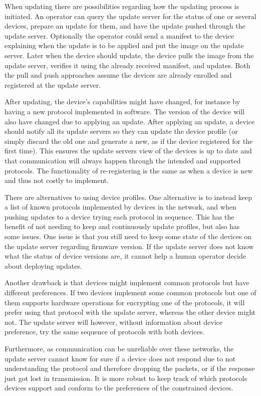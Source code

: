 \documentclass[0-thesis.tex]{subfiles}
\begin{document}
When updating there are possibilities regarding how the updating process is initiated. An
operator can query the update server for the status of one or several devices, prepare an
update for them, and have the update pushed through the update server. Optionally the
operator could send a manifest to the device explaining when the update is to be applied
and put the image on the update server. Later when the device should update, the device
pulls the image from the update server, verifies it using the already received manifest,
and updates. Both the pull and push approaches assume the devices are already enrolled and
registered at the update server.

After updating, the device's capabilities might have changed, for instance by having a new
protocol implemented in software. The version of the device will also have changed due to
applying an update. After applying an update, a device should notify all its update
servers so they can update the device profile (or simply discard the old one and generate
a new, as if the device registered for the first time). This ensures the update servers
view of the devices is up to date and that communication will always happen through the
intended and supported protocols. The functionality of re-registering is the same as when
a device is new and thus not costly to implement.

There are alternatives to using device profiles. One alternative is to instead keep a list
of known protocols implemented by devices in the network, and when pushing updates to a
device trying each protocol in sequence. This has the benefit of not needing to keep and
continuously update profiles, but also has some issues. One issue is that you still need
to keep some state of the devices on the update server regarding firmware version. If the
update server does not know what the status of device versions are, it cannot help a human
operator decide about deploying updates. 

Another drawback is that devices might implement common protocols but have different
preferences. If two devices implement some common protocols but one of them supports
hardware operations for encrypting one of the protocols, it will prefer using that
protocol with the update server, whereas the other device might not. The update server
will however, without information about device preference, try the same sequence of
protocols with both devices.

Furthermore, as communication can be unreliable over these networks, the update server
cannot know for sure if a device does not respond due to not understanding the protocol
and therefore dropping the packets, or if the response just got lost in transmission. It
is more robust to keep track of which protocols devices support and conform to the
preferences of the constrained devices.
\end{document}
